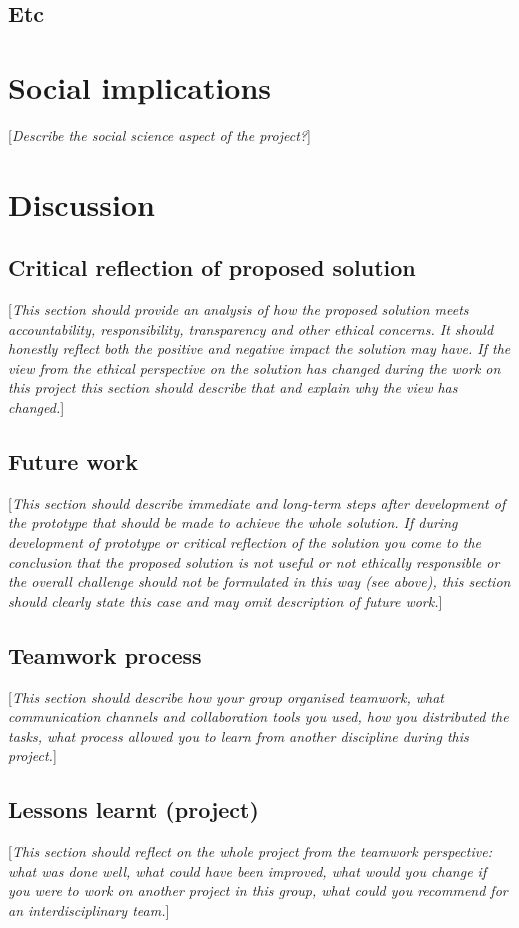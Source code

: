 \documentclass[10pt,english, openany]{book}
\begin{document}
\section{Etc}

\chapter{Social implications}
[\textit{Describe the social science aspect of the project?}]

\chapter{Discussion}\label{chapt:results}
\section{Critical reflection of proposed solution}
[\textit{This section should provide an analysis of how the proposed solution meets accountability, responsibility, transparency and other ethical concerns. It should honestly reflect both the positive and negative impact the solution may have. If the view from the ethical perspective on the solution has changed during the work on this project this section should describe that and explain why the view has changed.}]

\section{Future work}
[\textit{This section should describe immediate and long-term steps after development of the prototype that should be made to achieve the whole solution. If during development of prototype or critical reflection of the solution you come to the conclusion that the proposed solution is not useful or not ethically responsible or the overall challenge should not be formulated in this way (see above), this section should clearly state this case and may omit description of future work.}]

\section{Teamwork process}
[\textit{This section should describe how your group organised teamwork, what communication channels and collaboration tools you used, how you distributed the tasks, what process allowed you to learn from another discipline during this project.}]

\section{Lessons learnt (project)}
[\textit{This section should reflect on the whole project from the teamwork perspective: what was done well, what could have been improved, what would you change if you were to work on another project in this group, what could you recommend for an interdisciplinary team.}]
\end{document}
